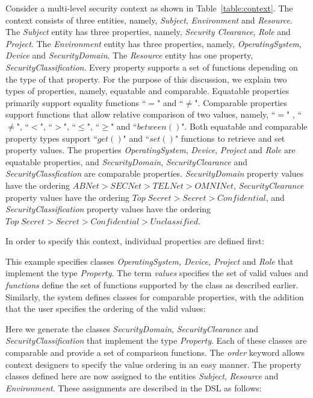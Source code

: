 Consider a multi-level security context as shown in Table~\ref{table:context}. The context consists of three entities, namely, {\em Subject}, {\em Environment} and {\em Resource}. The {\em Subject} entity has three properties, namely, {\em Security Clearance}, {\em Role} and {\em Project}.  The {\em Environment} entity has three properties, namely, {\em OperatingSystem}, {\em Device} and {\em SecurityDomain}.  The {\em Resource} entity has one property, {\em SecurityClassification}. Every property supports a set of functions depending on the type of that property.  For the purpose of this discussion, we explain two types of properties, namely, equatable and comparable.  Equatable properties primarily support equality functions  ``$=$" and ``$\ne$". Comparable properties support functions that allow relative comparison of two values, namely, ``$=$" , ``$\ne$", ``$<$", ``$>$",  ``$\leq$", ``$\geq$" and ``$between()$". Both equatable and comparable property types support ``$get()$" and ``$set()$" functions to retrieve and set property values. The properties {\em OperatingSystem}, {\em Device}, {\em Project} and {\em Role} are equatable properties, and {\em SecurityDomain}, {\em SecurityClearance} and {\em SecurityClassfication} are comparable properties. {\em SecurityDomain} property values have the ordering $ABNet > SECNet > TELNet > OMNINet$,  {\em SecurityClearance} property values have the ordering $Top\;Secret > Secret > Confidential$, and {\em SecurityClassification} property values have the ordering $Top\;Secret > Secret > Confidential > Unclassified$. 

In order to specify this context, individual properties are defined first: 


	
This example specifies classes {\em OperatingSystem, Device, Project} and {\em Role} that implement the type {\em Property}. The term {\em values} specifies the set of valid values and {\em functions} define the set of functions supported by the class as described earlier. Similarly, the system defines classes for comparable properties, with the addition that the user specifies the ordering of the valid values: 

\vfill\eject


Here we generate the classes {\em SecurityDomain}, {\em SecurityClearance} and {\em SecurityClassification} that implement the type {\em Property}. Each of these classes are comparable and provide a set of comparison functions. The {\em order} keyword allows context designers to specify the value ordering in an easy manner. The property classes defined here are now assigned to the entities {\em Subject}, {\em Resource} and {\em Environment}. These assignments are described in the DSL as follows: 

